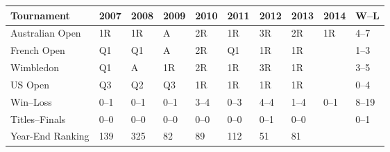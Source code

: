 \documentclass{article}
\begin{document}
\begin{tabular}{llllllllll}
\toprule
Tournament & 2007 & 2008 & 2009 & 2010 & 2011 & 2012 & 2013 & 2014 & W–L \\
\midrule
Australian Open & 1R & 1R & A & 2R & 1R & 3R & 2R & 1R & 4–7 \\
French Open & Q1 & Q1 & A & 2R & Q1 & 1R & 1R &  & 1–3 \\
Wimbledon & Q1 & A & 1R & 2R & 1R & 3R & 1R &  & 3–5 \\
US Open & Q3 & Q2 & Q3 & 1R & 1R & 1R & 1R &  & 0–4 \\
Win–Loss & 0–1 & 0–1 & 0–1 & 3–4 & 0–3 & 4–4 & 1–4 & 0–1 & 8–19 \\
Titles–Finals & 0–0 & 0–0 & 0–0 & 0–0 & 0–0 & 0–1 & 0–0 &  & 0–1 \\
Year-End Ranking & 139 & 325 & 82 & 89 & 112 & 51 & 81 &  &  \\
\bottomrule
\end{tabular}
\end{document}
